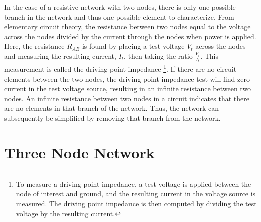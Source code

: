 In the case of a resistive network with two nodes, there is only one possible branch in the network and thus one possible element to characterize.
From elementary circuit theory, the resistance between two nodes equal to the voltage across the nodes divided by the current through the nodes when power is applied.  
Here, the resistance $R_{AB}$ is found by placing a test voltage $V_t$ across the nodes and measuring the resulting current, $I_t$, then taking the ratio $\frac{V_t}{I_t}$.
This measurement is called the driving point impedance \footnote{To measure a driving point impedance, a test voltage is applied between the node of interest and ground, and the resulting current in the voltage source is measured. 
The driving point impedance is then computed by dividing the test voltage by the resulting current.}.
If there are no circuit elements between the two nodes, the driving point impedance test will find zero current in the test voltage source, resulting in an infinite resistance between two nodes.
An infinite resistance between two nodes in a circuit indicates that there are no elements in that branch of the network.
Thus, the network can subsequently be simplified by removing that branch from the network.


\section{Three Node Network}

